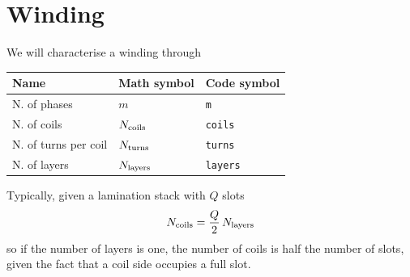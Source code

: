 \documentclass[a4paper,11pt,oneside,fleqn]{report}
\newcommand{\Ncoils}{N_{\textup{coils}}}
\newcommand{\Nturns}{N_{\textup{turns}}}
\newcommand{\Nlayers}{N_{\textup{layers}}}
\begin{document}
\chapter{Winding}
We will characterise a winding through

\begin{table}[h]
\centering
\begin{tabular}{lll}
\toprule
Name         & Math symbol    & Code symbol 
\\\midrule
%
N. of phases & $ m $          & \texttt{m} 
\\
N. of coils  & $ \Ncoils $ & 
\texttt{coils} \\
N. of turns per coil & $ \Nturns $ & 
\texttt{turns} \\
N. of layers & $ \Nlayers $ & \texttt{layers} \\
\bottomrule
\end{tabular}
\end{table}

Typically, given a lamination stack with $ Q $ slots
\begin{equation*}
\Ncoils = \frac{Q}{2}\,\Nlayers
\end{equation*}
so if the number of layers is one, the number of coils is 
half the number of slots, given the fact that a coil side 
occupies a full slot.
\end{document}
